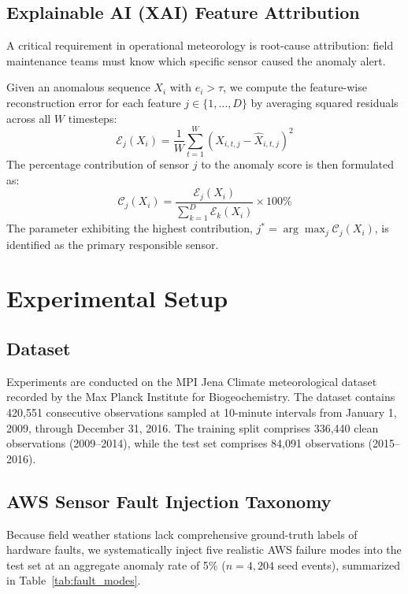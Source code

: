 \documentclass[conference]{IEEEtran}
\begin{document}
\subsection{Explainable AI (XAI) Feature Attribution}
A critical requirement in operational meteorology is root-cause attribution: field maintenance teams must know which specific sensor caused the anomaly alert.

Given an anomalous sequence $X_i$ with $e_i > \tau$, we compute the feature-wise reconstruction error for each feature $j \in \{1, \dots, D\}$ by averaging squared residuals across all $W$ timesteps:
\begin{equation}
    \mathcal{E}_j(X_i) = \frac{1}{W} \sum_{t=1}^W (X_{i,t,j} - \hat{X}_{i,t,j})^2
\end{equation}
The percentage contribution of sensor $j$ to the anomaly score is then formulated as:
\begin{equation}
    \mathcal{C}_j(X_i) = \frac{\mathcal{E}_j(X_i)}{\sum_{k=1}^D \mathcal{E}_k(X_i)} \times 100\%
\end{equation}
The parameter exhibiting the highest contribution, $j^* = \arg\max_j \mathcal{C}_j(X_i)$, is identified as the primary responsible sensor.

\section{Experimental Setup}

\subsection{Dataset}
Experiments are conducted on the MPI Jena Climate meteorological dataset recorded by the Max Planck Institute for Biogeochemistry. The dataset contains 420,551 consecutive observations sampled at 10-minute intervals from January 1, 2009, through December 31, 2016. The training split comprises 336,440 clean observations (2009--2014), while the test set comprises 84,091 observations (2015--2016).

\subsection{AWS Sensor Fault Injection Taxonomy}
Because field weather stations lack comprehensive ground-truth labels of hardware faults, we systematically inject five realistic AWS failure modes into the test set at an aggregate anomaly rate of 5\% ($n = 4,204$ seed events), summarized in Table~\ref{tab:fault_modes}.
\end{document}
